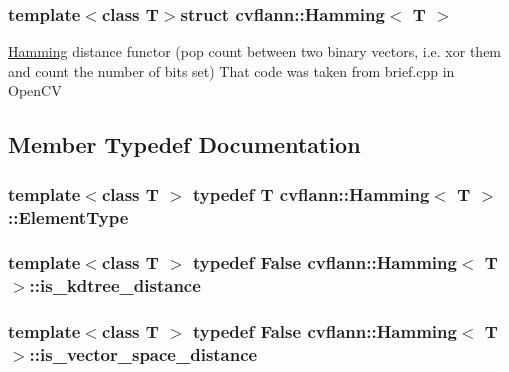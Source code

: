 \subsubsection*{template$<$class T$>$struct cvflann\-::\-Hamming$<$ T $>$}

\hyperlink{structcvflann_1_1Hamming}{Hamming} distance functor (pop count between two binary vectors, i.\-e. xor them and count the number of bits set) That code was taken from brief.\-cpp in Open\-C\-V 

\subsection{Member Typedef Documentation}
\hypertarget{structcvflann_1_1Hamming_a2be434e23cf78b659dc72d6a0d5fa41e}{
\subsubsection[{Element\-Type}]{\setlength{\rightskip}{0pt plus 5cm}template$<$class T $>$ typedef {\bf T} {\bf cvflann\-::\-Hamming}$<$ {\bf T} $>$\-::{\bf Element\-Type}}}\label{structcvflann_1_1Hamming_a2be434e23cf78b659dc72d6a0d5fa41e}
\hypertarget{structcvflann_1_1Hamming_a3b2a3e130d86c02b8cac98ae58645bad}{
\subsubsection[{is\-\_\-kdtree\-\_\-distance}]{\setlength{\rightskip}{0pt plus 5cm}template$<$class T $>$ typedef {\bf False} {\bf cvflann\-::\-Hamming}$<$ {\bf T} $>$\-::{\bf is\-\_\-kdtree\-\_\-distance}}}\label{structcvflann_1_1Hamming_a3b2a3e130d86c02b8cac98ae58645bad}
\hypertarget{structcvflann_1_1Hamming_ac59dee15cce5d7a01bf8dc54ef30a305}{
\subsubsection[{is\-\_\-vector\-\_\-space\-\_\-distance}]{\setlength{\rightskip}{0pt plus 5cm}template$<$class T $>$ typedef {\bf False} {\bf cvflann\-::\-Hamming}$<$ {\bf T} $>$\-::{\bf is\-\_\-vector\-\_\-space\-\_\-distance}}}\label{structcvflann_1_1Hamming_ac59dee15cce5d7a01bf8dc54ef30a305}
